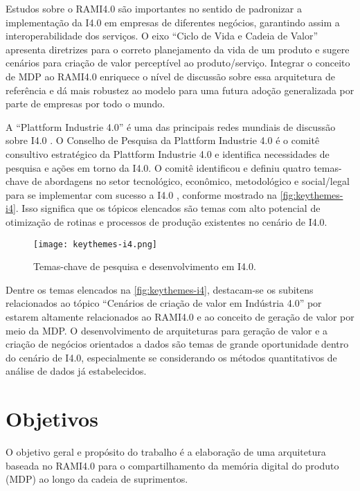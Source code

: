 Estudos sobre o RAMI4.0 são importantes no sentido de padronizar a implementação da I4.0 em empresas de diferentes negócios, garantindo assim a interoperabilidade dos serviços. O eixo ``Ciclo de Vida e Cadeia de Valor'' apresenta diretrizes para o correto planejamento da vida de um produto e sugere cenários para criação de valor perceptível ao produto/serviço. Integrar o conceito de MDP ao RAMI4.0 enriquece o nível de discussão sobre essa arquitetura de referência e dá mais robustez ao modelo para uma futura adoção generalizada por parte de empresas por todo o mundo.

A ``Plattform Industrie 4.0'' é uma das principais redes mundiais de discussão sobre I4.0 \cite{kagermann2013recommendations, acatech2014plattform, hartmut2019plattform}. O Conselho de Pesquisa da Plattform Industrie 4.0 é o comitê consultivo estratégico da Plattform Industrie 4.0 e identifica necessidades de pesquisa e ações em torno da I4.0. O comitê identificou e definiu quatro temas-chave de abordagens no setor tecnológico, econômico, metodológico e social/legal para se implementar com sucesso a I4.0 \cite{hirsch-kreinsen2019keythemes}, conforme mostrado na \autoref{fig:keythemes-i4}. Isso significa que os tópicos elencados são temas com alto potencial de otimização de rotinas e processos de produção existentes no cenário de I4.0.

\begin{figure}[htb]
	\centering
	\texttt{[image: keythemes-i4.png]}
	\caption{Temas-chave de pesquisa e desenvolvimento em I4.0.}
	\label{fig:keythemes-i4}
\end{figure}

Dentre os temas elencados na \autoref{fig:keythemes-i4}, destacam-se os subitens relacionados ao tópico ``Cenários de criação de valor em Indústria 4.0'' por estarem altamente relacionados ao RAMI4.0 e ao conceito de geração de valor por meio da MDP. O desenvolvimento de arquiteturas para geração de valor e a criação de negócios orientados a dados são temas de grande oportunidade dentro do cenário de I4.0, especialmente se considerando os métodos quantitativos de análise de dados já estabelecidos.

\section{Objetivos}
\label{sec:objetivos}

O objetivo geral e propósito do trabalho é a elaboração de uma arquitetura baseada no RAMI4.0 para o compartilhamento da memória digital do produto (MDP) ao longo da cadeia de suprimentos.

